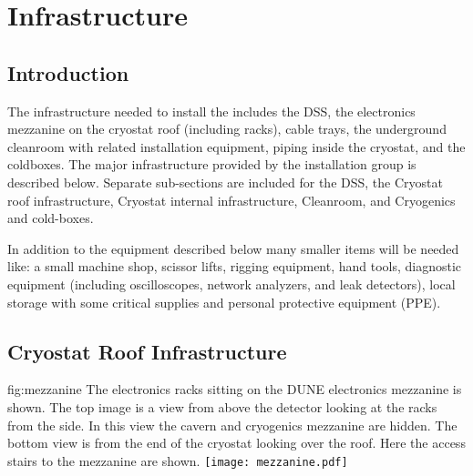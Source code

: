 \section{Infrastructure}
\label{sec:fdsp-tc-infr}


\subsection{Introduction}
\label{sec:fdsp-tc-infr-intro}

The infrastructure needed to install the  includes the DSS, the electronics mezzanine on the cryostat roof (including racks), cable trays, the underground cleanroom with related installation equipment, piping inside the cryostat, and the coldboxes. 
 The major infrastructure provided by the installation group is described below. 
 Separate sub-sections are included for the DSS, the Cryostat roof infrastructure, Cryostat internal infrastructure, Cleanroom, and Cryogenics and cold-boxes.

In addition to the equipment described below many smaller items will be needed like: a small machine shop, scissor lifts, rigging equipment, hand tools, diagnostic equipment (including oscilloscopes, network analyzers, and leak detectors), local storage with some critical supplies and personal protective equipment (PPE).  



\subsection{Cryostat Roof Infrastructure}
\label{sec:fdsp-tc-infr-cryo-roof}



\begin{dunefigure}{fig:mezzanine}
  {The electronics racks sitting on the DUNE electronics mezzanine is shown. The top image is a view from above the detector looking at the racks from the side. In this view the cavern and cryogenics mezzanine are hidden. The bottom view is from the end of the cryostat looking over the roof. Here the access stairs to the mezzanine are shown.}
 \texttt{[image: mezzanine.pdf]}
\end{dunefigure}

